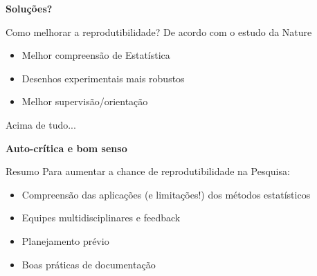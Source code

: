 \documentclass{beamer}
\begin{document}
\begin{frame}
  \begin{center}
    {\bf Soluções?}
  \end{center}
\end{frame}

\begin{frame}
  \begin{block}{Como melhorar a reprodutibilidade?}
    De acordo com o estudo da Nature
    \begin{itemize}
    \item Melhor compreensão de Estatística
    \item Desenhos experimentais mais robustos
    \item Melhor supervisão/orientação
    \end{itemize}
  \end{block}
\end{frame}

\begin{frame}{Acima de tudo...}
  \begin{center}
    {\bf Auto-crítica e bom senso}
  \end{center}
\end{frame}

\begin{frame}{Resumo}
  Para aumentar a chance de reprodutibilidade na Pesquisa:
  \begin{itemize}
  \item Compreensão das aplicações (e limitações!) dos métodos estatísticos
  \item Equipes multidisciplinares e feedback
  \item Planejamento prévio
  \item Boas práticas de documentação
  \end{itemize}
\end{frame}
\end{document}

